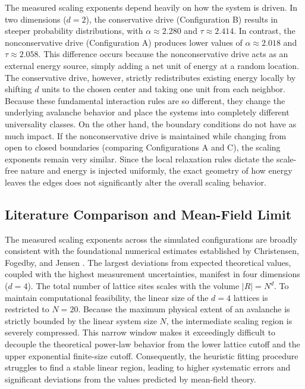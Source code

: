 The measured scaling exponents depend heavily on how the system is driven. In two dimensions ($d=2$), the conservative drive (Configuration B) results in steeper probability distributions, with $\alpha \approx 2.280$ and $\tau \approx 2.414$. In contrast, the nonconservative drive (Configuration A) produces lower values of $\alpha \approx 2.018$ and $\tau \approx 2.058$. This difference occurs because the nonconservative drive acts as an external energy source, simply adding a net unit of energy at a random location. The conservative drive, however, strictly redistributes existing energy locally by shifting $d$ units to the chosen center and taking one unit from each neighbor. Because these fundamental interaction rules are so different, they change the underlying avalanche behavior and place the systems into completely different universality classes. On the other hand, the boundary conditions do not have as much impact. If the nonconservative drive is maintained while changing from open to closed boundaries (comparing Configurations A and C), the scaling exponents remain very similar. Since the local relaxation rules dictate the scale-free nature and energy is injected uniformly, the exact geometry of how energy leaves the edges does not significantly alter the overall scaling behavior.

\subsection{Literature Comparison and Mean-Field Limit}

The measured scaling exponents across the simulated configurations are broadly consistent with the foundational numerical estimates established by Christensen, Fogedby, and Jensen \cite{christensen1991dynamical}. The largest deviations from expected theoretical values, coupled with the highest measurement uncertainties, manifest in four dimensions ($d=4$). The total number of lattice sites scales with the volume $|R| = N^{d}$. To maintain computational feasibility, the linear size of the $d=4$ lattices is restricted to $N=20$. Because the maximum physical extent of an avalanche is strictly bounded by the linear system size $N$, the intermediate scaling region is severely compressed. This narrow window makes it exceedingly difficult to decouple the theoretical power-law behavior from the lower lattice cutoff and the upper exponential finite-size cutoff. Consequently, the heuristic fitting procedure struggles to find a stable linear region, leading to higher systematic errors and significant deviations from the values predicted by mean-field theory.

